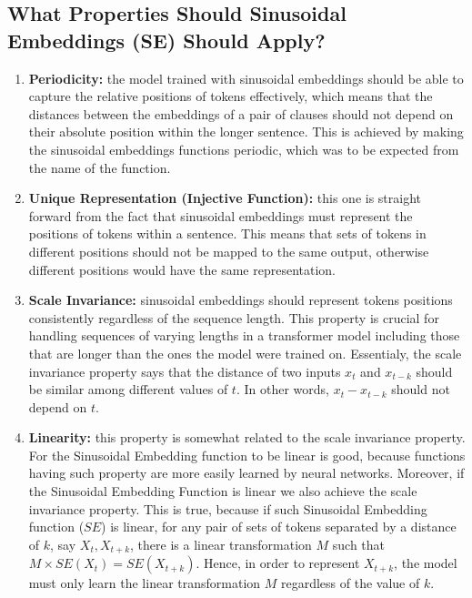 \documentclass{article}
\begin{document}


\subsection{What Properties Should Sinusoidal Embeddings (SE) Should Apply?}

\begin{enumerate}
	\item \textbf{Periodicity:} the model trained with sinusoidal embeddings should be able to capture the relative positions of tokens effectively, which means that the distances between the embeddings of a pair of clauses should not depend on their absolute position within the longer sentence. This is achieved by making the sinusoidal embeddings functions periodic, which was to be expected from the name of the function. 
	\item \textbf{Unique Representation (Injective Function):} this one is straight forward from the fact that  sinusoidal embeddings must represent the positions of tokens within a sentence. This means that sets of tokens in different positions should not be mapped to the same output, otherwise different positions would have the same representation.
	\item \textbf{Scale Invariance:} sinusoidal embeddings should represent tokens positions consistently regardless of the sequence length. This property is crucial for handling sequences of varying lengths in a transformer model including those that are longer than the ones the model were trained on. Essentialy, the scale invariance property says that the distance of two inputs $x_t$ and $x_{t - k}$ should be similar among different values of $t$. In other words, $x_t - x_{t - k}$ should not depend on $t$.
	\item \textbf{Linearity:} this property is somewhat related to the scale invariance property. For the Sinusoidal Embedding function to be linear is good, because functions having such property are more easily learned by neural networks. Moreover, if the Sinusoidal Embedding Function is linear we also achieve the scale invariance property. This is true, because if such Sinusoidal Embedding function ($SE$) is linear, for any pair of sets of tokens separated by a distance of $k$, say $X_t, X_{t+k}$, there is a linear transformation $M$ such that $M \times SE(X_t) = SE(X_{t+k})$. Hence, in order to represent $X_{t+k}$,  the model must only learn the linear transformation $M$ regardless of the value of $k$. 
\end{enumerate}
\end{document}

